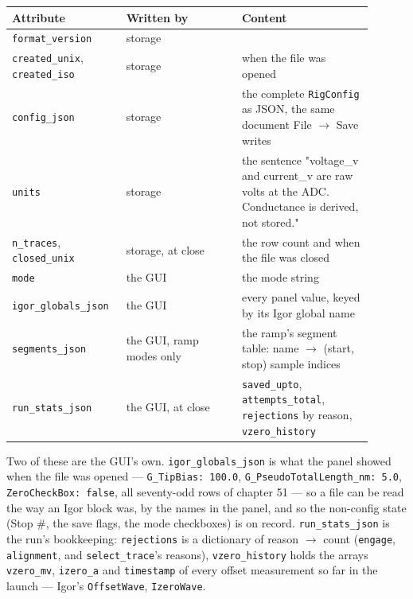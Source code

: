 \small\setlength{\LTleft}{0pt}\setlength{\LTright}{\fill}
\begin{longtable}{@{}>{\raggedright\arraybackslash}p{0.26\linewidth}>{\raggedright\arraybackslash}p{0.30\linewidth}>{\raggedright\arraybackslash}p{0.34\linewidth}@{}}
\toprule
\textbf{Attribute} & \textbf{Written by} & \textbf{Content} \\
\midrule\endhead
\texttt{format\_\discretionary{}{}{}version} & storage & 1 \\
\texttt{created\_\discretionary{}{}{}unix}, \texttt{created\_\discretionary{}{}{}iso} & storage & when the file was opened \\
\texttt{config\_\discretionary{}{}{}json} & storage & the complete \texttt{Rig\discretionary{}{}{}Config} as JSON, the same document File $\rightarrow$ Save writes \\
\texttt{units} & storage & the sentence "voltage\_v and current\_v are raw volts at the ADC. Conductance is derived, not stored." \\
\texttt{n\_\discretionary{}{}{}traces}, \texttt{closed\_\discretionary{}{}{}unix} & storage, at close & the row count and when the file was closed \\
\texttt{mode} & the GUI & the mode string \\
\texttt{igor\_\discretionary{}{}{}globals\_\discretionary{}{}{}json} & the GUI & every panel value, keyed by its Igor global name \\
\texttt{segments\_\discretionary{}{}{}json} & the GUI, ramp modes only & the ramp's segment table: name $\rightarrow$ (start, stop) sample indices \\
\texttt{run\_\discretionary{}{}{}stats\_\discretionary{}{}{}json} & the GUI, at close & \texttt{saved\_\discretionary{}{}{}upto}, \texttt{attempts\_\discretionary{}{}{}total}, \texttt{rejections} by reason, \texttt{vzero\_\discretionary{}{}{}history} \\
\bottomrule
\end{longtable}
\normalsize

Two of these are the GUI's own. \texttt{igor\_\discretionary{}{}{}globals\_\discretionary{}{}{}json} is what the panel showed when the file was opened --- \texttt{G\_\discretionary{}{}{}Tip\discretionary{}{}{}Bias: 100.\discretionary{}{}{}0}, \texttt{G\_\discretionary{}{}{}Pseudo\discretionary{}{}{}Total\discretionary{}{}{}Length\_\discretionary{}{}{}nm: 5.\discretionary{}{}{}0}, \texttt{Zero\discretionary{}{}{}Check\discretionary{}{}{}Box: false}, all seventy-odd rows of chapter 51 --- so a file can be read the way an Igor block was, by the names in the panel, and so the non-config state (Stop \#, the save flags, the mode checkboxes) is on record. \texttt{run\_\discretionary{}{}{}stats\_\discretionary{}{}{}json} is the run's bookkeeping: \texttt{rejections} is a dictionary of reason $\rightarrow$ count (\texttt{engage}, \texttt{alignment}, and \texttt{select\_\discretionary{}{}{}trace}'s reasons), \texttt{vzero\_\discretionary{}{}{}history} holds the arrays \texttt{vzero\_\discretionary{}{}{}mv}, \texttt{izero\_\discretionary{}{}{}a} and \texttt{timestamp} of every offset measurement so far in the launch --- Igor's \texttt{Offset\discretionary{}{}{}Wave}, \texttt{Izero\discretionary{}{}{}Wave}.

